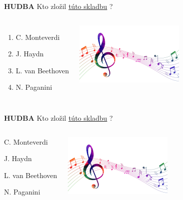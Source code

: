 \documentclass[dvipsnames]{beamer}
\begin{document}
\begin{frame}
	\textbf{HUDBA}
	\vskip 3mm
	Kto zložil \href{https://www.gtsforum.xyz/kviz1.mp3}{túto skladbu} ?
	\begin{columns}
		\begin{enumerate}
			\item C. Monteverdi
			\item J. Haydn
			\item L. van Beethoven
			\item N. Paganini
		\end{enumerate}
		\includegraphics[scale=0.5]{music}
	\end{columns}
\end{frame}
\begin{frame}
	\textbf{HUDBA}
	\vskip 3mm
	Kto zložil \href{https://www.gtsforum.xyz/kviz1.mp3}{túto skladbu} ?
	\begin{columns}
		\column{0.5\textwidth}
		\begin{enumerate}
			\item C. Monteverdi
			      \textcolor{g}{\item[\textcolor{g}{2.}] J. Haydn}\setcounter{enumi}{2}
			\item L. van Beethoven
			\item  N. Paganini
		\end{enumerate}
		\column{0.5\textwidth}
		\includegraphics[scale=0.5]{music}

	\end{columns}
\end{frame}
\end{document}
